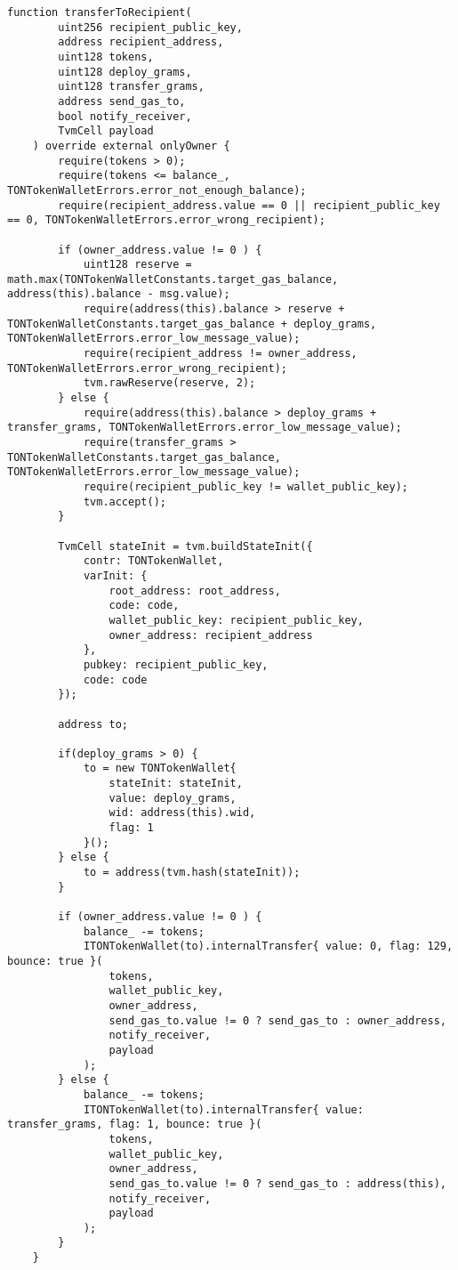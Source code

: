 \begin{lstlisting}[firstnumber=177]
    function transferToRecipient(
        uint256 recipient_public_key,
        address recipient_address,
        uint128 tokens,
        uint128 deploy_grams,
        uint128 transfer_grams,
        address send_gas_to,
        bool notify_receiver,
        TvmCell payload
    ) override external onlyOwner {
        require(tokens > 0);
        require(tokens <= balance_, TONTokenWalletErrors.error_not_enough_balance);
        require(recipient_address.value == 0 || recipient_public_key == 0, TONTokenWalletErrors.error_wrong_recipient);

        if (owner_address.value != 0 ) {
            uint128 reserve = math.max(TONTokenWalletConstants.target_gas_balance, address(this).balance - msg.value);
            require(address(this).balance > reserve + TONTokenWalletConstants.target_gas_balance + deploy_grams, TONTokenWalletErrors.error_low_message_value);
            require(recipient_address != owner_address, TONTokenWalletErrors.error_wrong_recipient);
            tvm.rawReserve(reserve, 2);
        } else {
            require(address(this).balance > deploy_grams + transfer_grams, TONTokenWalletErrors.error_low_message_value);
            require(transfer_grams > TONTokenWalletConstants.target_gas_balance, TONTokenWalletErrors.error_low_message_value);
            require(recipient_public_key != wallet_public_key);
            tvm.accept();
        }

        TvmCell stateInit = tvm.buildStateInit({
            contr: TONTokenWallet,
            varInit: {
                root_address: root_address,
                code: code,
                wallet_public_key: recipient_public_key,
                owner_address: recipient_address
            },
            pubkey: recipient_public_key,
            code: code
        });

        address to;

        if(deploy_grams > 0) {
            to = new TONTokenWallet{
                stateInit: stateInit,
                value: deploy_grams,
                wid: address(this).wid,
                flag: 1
            }();
        } else {
            to = address(tvm.hash(stateInit));
        }

        if (owner_address.value != 0 ) {
            balance_ -= tokens;
            ITONTokenWallet(to).internalTransfer{ value: 0, flag: 129, bounce: true }(
                tokens,
                wallet_public_key,
                owner_address,
                send_gas_to.value != 0 ? send_gas_to : owner_address,
                notify_receiver,
                payload
            );
        } else {
            balance_ -= tokens;
            ITONTokenWallet(to).internalTransfer{ value: transfer_grams, flag: 1, bounce: true }(
                tokens,
                wallet_public_key,
                owner_address,
                send_gas_to.value != 0 ? send_gas_to : address(this),
                notify_receiver,
                payload
            );
        }
    }
\end{lstlisting}

